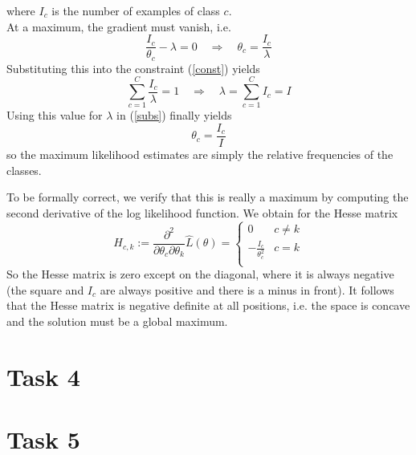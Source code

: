 \documentclass[%
   11pt,              %
   ngerman,           %
   a4paper,           %
   DIV11,             %
]{scrartcl}%
\begin{document}
where $I_c$ is the number of examples of class $c$. \\
At a maximum, the gradient must vanish, i.e.
\begin{equation}\label{subs}
	\frac{I_c}{\theta_c} - \lambda = 0 \quad \Rightarrow \quad \theta_c = \frac{I_c}{\lambda}
\end{equation}
Substituting this into the constraint (\ref{const}) yields
\begin{equation*}
	\sum_{c=1}^C \frac{I_c}{\lambda} = 1 \quad \Rightarrow \quad \lambda = \sum_{c=1}^C I_c = I
\end{equation*}
Using this value for $\lambda$ in (\ref{subs}) finally yields
\begin{equation*}
	\theta_c = \frac{I_c}{I}
\end{equation*}
so the maximum likelihood estimates are simply the relative frequencies of the classes. \par
To be formally correct, we verify that this is really a maximum by computing the second derivative of the log likelihood function. We obtain for the Hesse matrix
\begin{equation*}
	H_{c,k} := \frac{\partial^2}{\partial \theta_c \partial \theta_k} \hat{L}(\theta) = \begin{cases}
	0 & c \neq k \\
	- \frac{I_c}{\theta_c^2} & c = k \\ \end{cases}
\end{equation*}
So the Hesse matrix is zero except on the diagonal, where it is always negative (the square and $I_c$ are always positive and there is a minus in front). It follows that the Hesse matrix is negative definite at all positions, i.e. the space is concave and the solution must be a global maximum.
\section*{Task 4}
\section*{Task 5}
\end{document}
